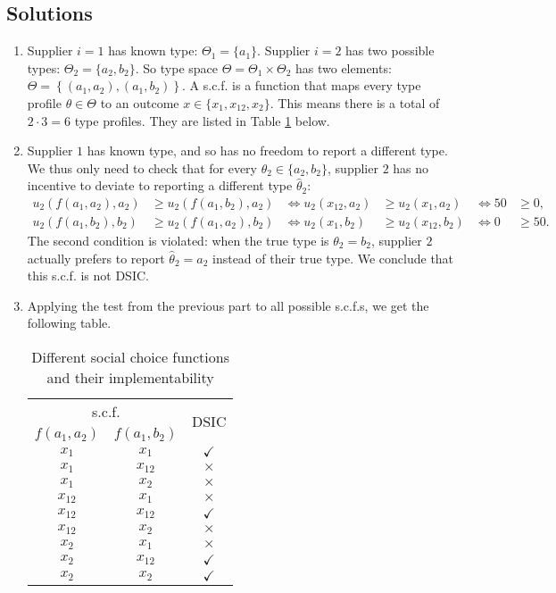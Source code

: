 \documentclass[a4paper]{article}
\begin{document}
\subsection*{Solutions}
\begin{enumerate}
	\item Supplier $i=1$ has known type: $\Theta_1 = \{a_1\}$. Supplier $i=2$ has two possible types: $\Theta_2 = \{a_2, b_2\}$. So type space $\Theta = \Theta_1 \times \Theta_2$ has two elements: $\Theta = \left\{ (a_1,a_2), (a_1,b_2) \right\}$.
	A s.c.f. is a function that maps every type profile $\theta \in \Theta$ to an outcome $x \in \{x_1, x_{12}, x_2\}$. This means there is a total of $2 \cdot 3 = 6$ type profiles. They are listed in Table \ref{tab:supplier_scfs} below.
	
	\item Supplier $1$ has known type, and so has no freedom to report a different type. We thus only need to check that for every $\theta_2 \in \{a_2, b_2\}$, supplier $2$ has no incentive to deviate to reporting a different type $\hat{\theta}_2$:
	\begin{align*}
		u_2\left( f(a_1, a_2), a_2 \right) &\geq u_2\left( f(a_1, b_2), a_2 \right)
		& \iff u_2\left( x_{12}, a_2 \right) &\geq u_2\left( x_1, a_2 \right)
		& \iff 50 & \geq 0,
		& 
		\\
		u_2\left( f(a_1, b_2), b_2 \right) &\geq u_2\left( f(a_1, a_2), b_2 \right)
		& \iff u_2\left( x_1, b_2 \right) &\geq u_2\left( x_{12}, b_2 \right)
		& \iff 0 & \geq 50.& 
	\end{align*}
	The second condition is violated: when the true type is $\theta_2 = b_2$, supplier $2$ actually prefers to report $\hat{\theta}_2 = a_2$ instead of their true type. We conclude that this s.c.f. is not DSIC.
	
	\item Applying the test from the previous part to all possible s.c.f.s, we get the following table.
	\begin{table}[h]
		\centering
		\begin{tabular}{c|c|c}
			\multicolumn{2}{c|}{s.c.f.} & \multirow{2}{*}{DSIC}
			\\ \cline{1-2}
			$f(a_1, a_2)$ & $f(a_1, b_2)$ &
			\\ \hline 
			$x_{1}$ & $x_{1}$ & $\checkmark$
			\\
			$x_{1}$ & $x_{12}$ & $\times$
			\\
			$x_{1}$ & $x_{2}$ & $\times$
			\\
			$x_{12}$ & $x_{1}$ & $\times$
			\\
			$x_{12}$ & $x_{12}$ & $\checkmark$
			\\
			$x_{12}$ & $x_{2}$ & $\times$
			\\
			$x_{2}$ & $x_{1}$ & $\times$
			\\
			$x_{2}$ & $x_{12}$ & $\checkmark$
			\\
			$x_{2}$ & $x_{2}$ & $\checkmark$
		\end{tabular}
		\caption{Different social choice functions and their implementability \label{tab:supplier_scfs}}
	\end{table}
	

\end{enumerate}
\end{document}
